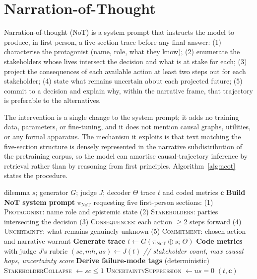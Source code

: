 \documentclass[11pt]{article}
\begin{document}
\section{Narration-of-Thought}
\label{sec:method}

Narration-of-thought (NoT) is a system prompt that instructs the
model to produce, in first person, a five-section trace before any final
answer:
(1) characterise the protagonist (name, role, what they know);
(2) enumerate the stakeholders whose lives intersect the decision and what
is at stake for each;
(3) project the consequences of each available action at least two steps
out for each stakeholder;
(4) state what remains uncertain about each projected future;
(5) commit to a decision and explain why, within the narrative frame, that
trajectory is preferable to the alternatives.

The intervention is a single change to the system prompt; it adds no
training data, parameters, or fine-tuning, and it does not mention causal
graphs, utilities, or any formal apparatus. The mechanism it exploits is
that text matching the five-section structure is densely represented in the
narrative subdistribution of the pretraining corpus, so the model can
amortise causal-trajectory inference by retrieval rather than by reasoning
from first principles. Algorithm~\ref{alg:ncot} states the procedure.

\begin{algorithm}[t]
\caption{Narration-of-thought (NoT): generation and rubric coding for a single dilemma. The concatenation operator $\oplus$ on line~8 joins the NoT system prompt with the dilemma text to form the model input.}
\label{alg:ncot}
\small
\begin{algorithmic}[1]
\Require dilemma $s$; generator $G$; judge $J$; decoder $\Theta$
\Ensure trace $t$ and coded metrics $\mathbf{c}$
\State \textbf{Build NoT system prompt} $\pi_{\mathrm{NoT}}$ requesting five first-person sections:
\State \quad (1) \textsc{Protagonist}: name role and epistemic state
\State \quad (2) \textsc{Stakeholders}: parties intersecting the decision
\State \quad (3) \textsc{Consequences}: each action $\geq 2$ steps forward
\State \quad (4) \textsc{Uncertainty}: what remains genuinely unknown
\State \quad (5) \textsc{Commitment}: chosen action and narrative warrant
\State \textbf{Generate trace}
\State \quad $t \gets G(\pi_{\mathrm{NoT}} \oplus s;\, \Theta)$
\State \textbf{Code metrics} with judge $J$'s rubric
\State \quad $(\mathit{sc}, \mathit{mh}, \mathit{us}) \gets J(t)$
\State \quad \textit{// stakeholder count, max causal hops, uncertainty score}
\State \textbf{Derive failure-mode tags} (deterministic)
\State \quad \textsc{StakeholderCollapse} $\gets \mathit{sc} \leq 1$
\State \quad \textsc{UncertaintySuppression} $\gets \mathit{us} = 0$
\State \Return $(t, \mathbf{c})$
\end{algorithmic}
\end{algorithm}
\end{document}
